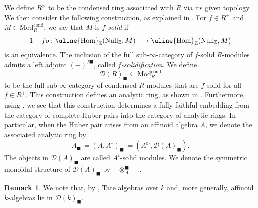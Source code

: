 \documentclass[oneside, hidelinks, 12pt, a4paper,reqno]{amsart}
\theoremstyle{plain}
\theoremstyle{definition}
\newtheorem{remark}[remark]{Remark}
\theoremstyle{plain}
\newcommand{\Z}{\mathbb Z}
\newcommand{\cD}{\mathscr D}
\newcommand{\Hom}{\mathrm{Hom}}
\newcommand{\Mod}{\mathrm{Mod}}
\newcommand{\Solid}{\blacksquare}
\begin{document}
We define $R^{\triangleright}$ to be the condensed ring associated with $R$ via its given topology. We then consider the following construction, as explained in \cite{andreychev2021pseudocoherent}.
For $f \in R^+$ and $M \in \Mod_{R}^{\mathrm{cond}}$, we say that $M$ is \emph{$f$-solid} if
\[
1 - f\sigma \colon \uline{\Hom}_\Z(\mathrm{Null}_\Z, M) \longrightarrow \uline{\Hom}_\Z(\mathrm{Null}_\Z, M)
\]
is an equivalence. The inclusion of the full sub-$\infty$-category of $f$-solid $R$-modules admits a left adjoint $(-)^{f\Solid}$, called \emph{$f$-solidification}. We define 
\[
\cD(R)_\Solid \subseteq \Mod_{R}^{\mathrm{cond}}
\]
to be the full sub-$\infty$-category of condensed $R$-modules that are $f$-solid for all $f \in R^+$. This construction defines an analytic ring, as shown in \cite[Theorem 3.28]{andreychev2021pseudocoherent}. Furthermore, using \cite[Theorem 3.33]{andreychev2021pseudocoherent}, we see that this construction determines a fully faithful embedding from the category of complete Huber pairs into the category of analytic rings. In particular, when the Huber pair arises from an affinoid algebra $A$, we denote the associated analytic ring by 
\[
A_\Solid \coloneqq (A,A^\circ)_\Solid \coloneqq (A^\triangleright, \cD(A)_\Solid).
\]
The objects in $\cD(A)_\Solid$ are called $A^\circ$-solid modules. We denote the symmetric monoidal structure of $\cD(A)_\Solid$ by $-\otimes^{\Solid}_{A}-$.
\begin{remark}
    We note that, by \cite[Proposition 2.3]{mikami2023fppfdescentcondensedanimatedrings}, Tate algebras over $k$ and, more generally, affinoid $k$-algebras lie in $\cD(k)_{\Solid}$.
\end{remark}
\end{document}
